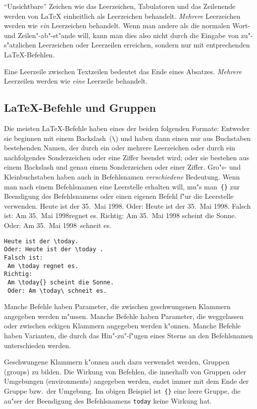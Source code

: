 "`Unsichtbare"' Zeichen wie das Leerzeichen, Tabulatoren
und das Zeilenende werden von \LaTeX{}
einheitlich als Leerzeichen behandelt.  \emph{Mehrere}
Leerzeichen werden wie \emph{ein} Leerzeichen behandelt.   
Wenn man andere als die normalen Wort- und Zeilen"-ab"-st"ande
will, kann man dies also nicht durch die Eingabe von
zu"-s"atzlichen Leerzeichen oder Leerzeilen erreichen, sondern
nur mit entprechenden \LaTeX-Befehlen.

Eine Leerzeile zwischen Textzeilen bedeutet das Ende eines 
Absatzes.  \emph{Mehrere} Leerzeilen werden wie \emph{eine}
Leerzeile behandelt.
 
 
\subsection{\LaTeX-Befehle und Gruppen}
 
Die meisten \LaTeX-Befehle haben eines der beiden folgenden
Formate: Entweder sie beginnen mit einem Back\-slash~(\verb|\|)
und haben dann einen nur aus Buchstaben bestehenden Namen, der
durch ein oder mehrere Leerzeichen oder durch ein nachfolgendes
Sonderzeichen oder eine Ziffer beendet wird; oder sie bestehen
aus einem Back\-slash und genau einem Sonderzeichen oder einer
Ziffer.
Gro"s- und Kleinbuchstaben haben auch in Befehlsnamen
\emph{verschiedene} Bedeutung.
Wenn man nach einem Befehlsnamen eine Leerstelle erhalten will,
mu"s man~\verb|{}| zur Beendigung des Befehlsnamens oder einen
eigenen Befehl f"ur die Leerstelle verwenden.
\exa
  \renewcommand{\today}{35.~Mai 1998}  %
Heute ist der \today.
Oder: Heute ist der \today .
Falsch ist: Am \today regnet es.
Richtig: Am \today{} scheint die Sonne.
Oder: Am \today\ schneit es.
\exb
\begin{verbatim}
Heute ist der \today.
Oder: Heute ist der \today .
Falsch ist:
 Am \today regnet es.
Richtig:
 Am \today{} scheint die Sonne.
 Oder: Am \today\ schneit es.
\end{verbatim}
\exc
 
Manche Befehle haben Parameter, die zwischen geschwungenen
Klammern angegeben werden m"ussen.
Manche Befehle haben Parameter, die weggelassen oder zwischen
eckigen Klammern angegeben werden k"onnen.
Manche Befehle haben Varianten, die durch das Hin"-zu"-f"ugen
eines Sterns an den Befehlsnamen unterschieden werden.

Geschwungene Klammern k"onnen auch dazu verwendet werden, Gruppen
(groups) zu bilden.
Die Wirkung von Befehlen, die innerhalb von Gruppen oder
Umgebungen (environments) angegeben werden, endet immer mit dem
Ende der Gruppe bzw.\ der Umgebung.  Im obigen Beispiel
ist~\verb|{}| eine leere Gruppe, die au"ser der Beendigung des
Befehlsnamens \texttt{today} keine Wirkung hat.
 
